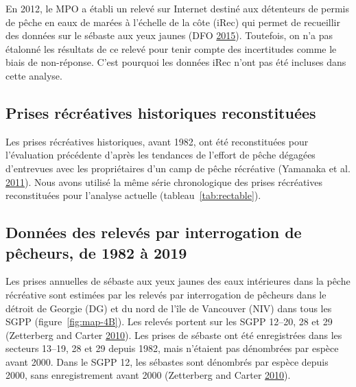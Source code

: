 \documentclass[11pt]{book}
\begin{document}
\hypertarget{sec:rec-catch-data}{%
\label{sec:rec-catch-data}}

En 2012, le MPO a établi un relevé sur Internet destiné aux détenteurs de permis de pêche en eaux de marées à l'échelle de la côte (iRec) qui permet de recueillir des données sur le sébaste aux yeux jaunes (DFO \protect\hyperlink{ref-dfo2015}{2015}). Toutefois, on n'a pas étalonné les résultats de ce relevé pour tenir compte des incertitudes comme le biais de non-réponse. C'est pourquoi les données iRec n'ont pas été incluses dans cette analyse.

\hypertarget{sec:recon-rec-catch-data}{%
\subsection{Prises récréatives historiques reconstituées}\label{sec:recon-rec-catch-data}}

Les prises récréatives historiques, avant 1982, ont été reconstituées pour l'évaluation précédente d'après les tendances de l'effort de pêche dégagées d'entrevues avec les propriétaires d'un camp de pêche récréative (Yamanaka et al. \protect\hyperlink{ref-yamanaka2011}{2011}). Nous avons utilisé la même série chronologique des prises récréatives reconstituées pour l'analyse actuelle (tableau~\ref{tab:rectable}).

\hypertarget{sec:creel-catch-data}{%
\subsection{Données des relevés par interrogation de pêcheurs, de 1982 à 2019}\label{sec:creel-catch-data}}

Les prises annuelles de sébaste aux yeux jaunes des eaux intérieures dans la pêche récréative sont estimées par les relevés par interrogation de pêcheurs dans le détroit de Georgie (DG) et du nord de l'île de Vancouver (NIV) dans tous les SGPP (figure~\ref{fig:map-4B}). Les relevés portent sur les SGPP 12--20, 28 et 29 (Zetterberg and Carter \protect\hyperlink{ref-zetterberg2010}{2010}). Les prises de sébaste ont été enregistrées dans les secteurs 13--19, 28 et 29 depuis 1982, mais n'étaient pas dénombrées par espèce avant 2000. Dans le SGPP 12, les sébastes sont dénombrés par espèce depuis 2000, sans enregistrement avant 2000 (Zetterberg and Carter \protect\hyperlink{ref-zetterberg2010}{2010}).
\end{document}
